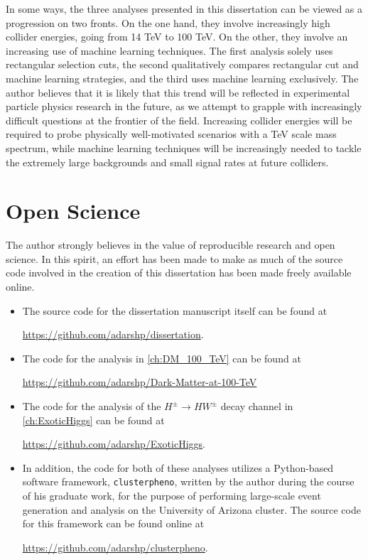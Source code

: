 In some ways, the three analyses presented in this dissertation can be viewed as a progression on two fronts. On the one hand, they involve increasingly high collider energies, going from 14 TeV to 100 TeV. On the other, they involve an increasing use of machine learning techniques. The first analysis solely uses rectangular selection cuts, the second qualitatively compares rectangular cut and machine learning strategies, and the third uses machine learning exclusively. The author believes that it is likely that this trend will be reflected in experimental particle physics research in the future, as we attempt to grapple with increasingly difficult questions at the frontier of the field. Increasing collider energies will be required to probe physically well-motivated scenarios with a TeV scale mass spectrum, while machine learning techniques will be increasingly needed to tackle the extremely large backgrounds and small signal rates at future colliders.

\section*{Open Science}

The author strongly believes in the value of reproducible research and open science. In this spirit, an effort has been made to make as much of the source code involved in the creation of this dissertation has been made freely available online.

\begin{itemize}
\item The source code for the dissertation manuscript itself can be found at 

\url{https://github.com/adarshp/dissertation}.
\item The code for the analysis in \autoref{ch:DM_100_TeV} can be found at

\url{https://github.com/adarshp/Dark-Matter-at-100-TeV}
\item The code for the analysis of the $H^\pm\rightarrow HW^\pm$ decay channel in \autoref{ch:ExoticHiggs} can be found at

\url{https://github.com/adarshp/ExoticHiggs}.
\item In addition, the code for both of these analyses utilizes a Python-based software framework, \texttt{clusterpheno}, written by the author during the course of his graduate work, for the purpose of performing large-scale event generation and analysis on the University of Arizona cluster. The source code for this framework can be found online at 

\url{https://github.com/adarshp/clusterpheno}.
\end{itemize}

